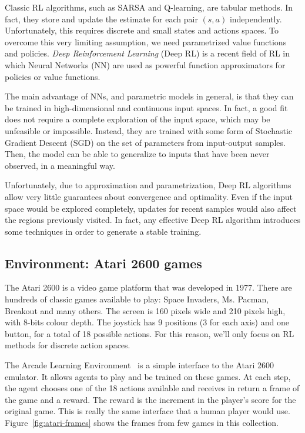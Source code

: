 Classic RL algorithms, such as SARSA and Q-learning, are tabular methods.
In fact, they store and update the estimate for each pair $(s, a)$
independently. Unfortunately, this requires discrete and small states and
actions spaces. To overcome this very limiting assumption, we need
parametrized value functions and policies.  \emph{Deep Reinforcement Learning}
(Deep RL) is a recent field of RL in which Neural Networks (NN) are used as
powerful function approximators for policies or value functions.

The main advantage of NNs, and parametric models in general, is that they can
be trained in high-dimensional and continuous input spaces. In fact, a good
fit does not require a complete exploration of the input space, which may be
unfeasible or impossible. Instead, they are trained with some form of
Stochastic Gradient Descent (SGD) on the set of parameters from input-output
samples. Then, the model can be able to generalize to inputs that have been
never observed, in a meaningful way.

Unfortunately, due to approximation and parametrization, Deep RL algorithms
allow very little guarantees about convergence and optimality. Even if the
input space would be explored completely, updates for recent samples would
also affect the regions previously visited. In fact, any effective Deep RL
algorithm introduces some techniques in order to generate a stable training.


\subsection{Environment: Atari 2600 games}

The Atari 2600 is a video game platform that was developed in 1977. There are
hundreds of classic games available to play: Space Invaders, Ms. Pacman,
Breakout and many others. The screen is 160 pixels wide and 210 pixels high,
with 8-bits colour depth. The joystick has 9 positions (3 for each axis) and
one button, for a total of 18 possible actions. For this reason, we'll only
focus on RL methods for discrete action spaces.

The Arcade Learning Environment~\cite{bib:atari-games} is a simple interface
to the Atari 2600 emulator. It allows agents to play and be trained on these
games. At each step, the agent chooses one of the 18 actions available and
receives in return a frame of the game and a reward. The reward is the
increment in the player's score for the original game. This is really the same
interface that a human player would use. Figure~\ref{fig:atari-frames} shows
the frames from few games in this collection. 

